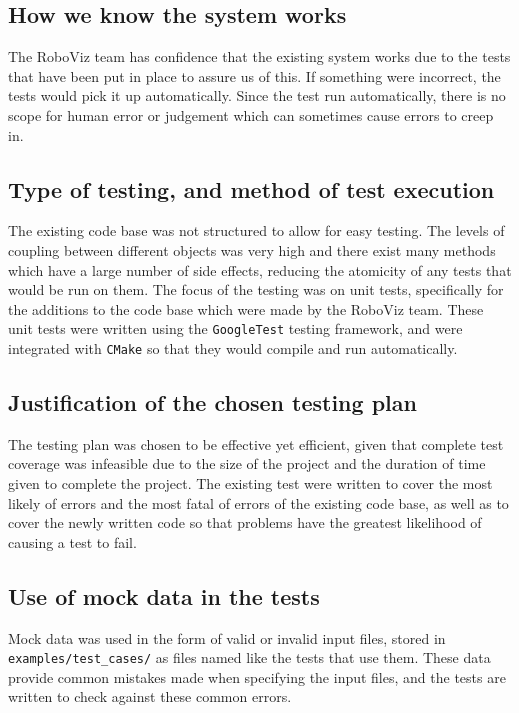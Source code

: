 \documentclass[11pt,a4paper]{article}
\begin{document}
\subsection{How we know the system works}
The RoboViz team has confidence that the existing system works due to the tests
that have been put in place to assure us of this. If something were incorrect,
the tests would pick it up automatically. Since the test run automatically,
there is no scope for human error or judgement which can sometimes cause errors
to creep in.

\subsection{Type of testing, and method of test execution}
The existing code base was not structured to allow for easy testing. The levels
of coupling between different objects was very high and there exist many
methods which have a large number of side effects, reducing the atomicity of
any tests that would be run on them. The focus of the testing was on unit
tests, specifically for the additions to the code base which were made by the
RoboViz team. These unit tests were written using the \texttt{GoogleTest} testing
framework, and were integrated with \texttt{CMake} so that they would compile
and run automatically.

\subsection{Justification of the chosen testing plan}
The testing plan was chosen to be effective yet efficient, given that complete
test coverage was infeasible due to the size of the project and the duration of
time given to complete the project. The existing test were written to cover the
most likely of errors and the most fatal of errors of the existing code base,
as well as to cover the newly written code so that problems have the greatest
likelihood of causing a test to fail.

\subsection{Use of mock data in the tests}
Mock data was used in the form of valid or invalid input files, stored in
\texttt{examples/test\_cases/} as files named like the tests that use them.
These data provide common mistakes made when specifying the input files, and
the tests are written to check against these common errors.
\end{document}
